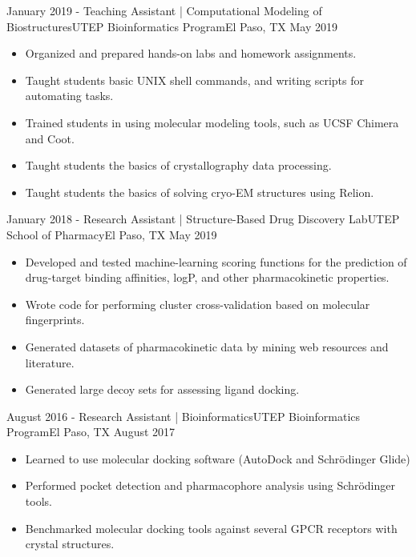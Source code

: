 \begin{experiences}
  \emptySeparator
  
  \experience
    {January 2019 -}     {Teaching Assistant | Computational Modeling of Biostructures}{UTEP Bioinformatics Program}{El Paso, TX}
    {May 2019}    {
        \begin{itemize}
        \item Organized and prepared hands-on labs and homework assignments.
        \item Taught students basic UNIX shell commands, and writing scripts for automating tasks.
        \item Trained students in using molecular modeling tools, such as UCSF Chimera and Coot.
        \item Taught students the basics of crystallography data processing.
        \item Taught students the basics of solving  cryo-EM structures using Relion.
        \end{itemize}
    }
                  
  \emptySeparator
  
  \experience
    {January 2018 -}     {Research Assistant | Structure-Based Drug Discovery Lab}{UTEP School of Pharmacy}{El Paso, TX}
    {May 2019}    {
        \begin{itemize}
        \item Developed and tested machine-learning scoring functions for the prediction of drug-target binding affinities, logP, and other pharmacokinetic properties.
        \item Wrote code for performing cluster cross-validation based on molecular fingerprints.
        \item Generated datasets of pharmacokinetic data by mining web resources and literature.
        \item Generated large decoy sets for assessing ligand docking.
        \end{itemize}
    }
                  
  \emptySeparator
  
  \experience
    {August 2016 -}     {Research Assistant | Bioinformatics}{UTEP Bioinformatics Program}{El Paso, TX}
    {August 2017}    {
        \begin{itemize}
        \item Learned to use molecular docking software (AutoDock and Schrödinger Glide)
        \item Performed pocket detection and pharmacophore analysis using Schrödinger tools.
        \item Benchmarked molecular docking tools against several GPCR receptors with crystal structures.
        \end{itemize}
    }
                  

\end{experiences}
